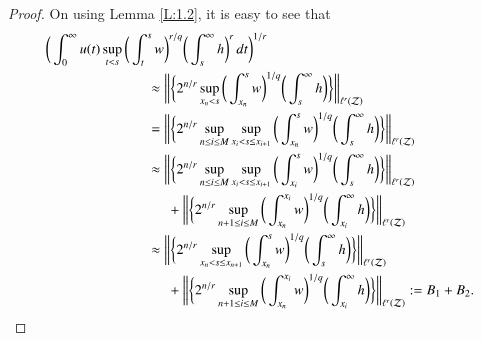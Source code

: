 \documentclass[12pt]{amsart}
\theoremstyle{plain}
\theoremstyle{definition}
\numberwithin{thm}{section}
\numberwithin{equation}{section}
\begin{document}
\begin{proof}
	On using Lemma \ref{L:1.2}, it is easy to see that
	\begin{align*}
    \bigg( \int_0^{\infty}  u(t) \sup_{t < s} \bigg(
	\int_t^s w \bigg)^{r / q} \bigg( \int_s^{\infty} h\bigg)^r \,dt\bigg)^{1/r} & \\
	& \hspace{-3cm}  \approx \bigg\| \bigg\{  2^{n / r} \sup_{x_n < s} \bigg(
	\int_{x_n}^s w \bigg)^{1 / q} \bigg( \int_s^{\infty} h\bigg) \bigg\} \bigg\|_{\ell^r({\mathcal Z})} \\
	& \hspace{-3cm}  =  \bigg\| \bigg\{  2^{n / r} \sup_{n \le i \le M} \sup_{x_i < s \le x_{i+1}} \bigg(
	\int_{x_n}^s w \bigg)^{1 / q} \bigg( \int_s^{\infty} h\bigg) \bigg\} \bigg\|_{\ell^r({\mathcal Z})} \\
	& \hspace{-3cm}  \approx  \bigg\| \bigg\{  2^{n / r} \sup_{n \le i \le M} \sup_{x_i < s \le x_{i+1}} \bigg(
	\int_{x_i}^s w \bigg)^{1 / q} \bigg( \int_s^{\infty} h\bigg) \bigg\} \bigg\|_{\ell^r({\mathcal Z})} \\
	& \hspace{-2.5cm}  +  \bigg\| \bigg\{  2^{n / r} \sup_{n + 1\le i \le M}  \bigg(
	\int_{x_n}^{x_i} w \bigg)^{1 / q} \bigg( \int_{x_i}^{\infty} h\bigg)\bigg\} \bigg\|_{\ell^r({\mathcal Z})} \\
	& \hspace{-3cm}  \approx  \bigg\| \bigg\{  2^{n / r} \sup_{x_n < s \le x_{n+1}} \bigg(
	\int_{x_n}^s w \bigg)^{1 / q} \bigg( \int_s^{\infty} h\bigg) \bigg\} \bigg\|_{\ell^r({\mathcal Z})} \\
	& \hspace{-2.5cm}  +  \bigg\| \bigg\{  2^{n / r} \sup_{n + 1 \le i \le M}  \bigg(
	\int_{x_n}^{x_i} w \bigg)^{1 / q} \bigg( \int_{x_i}^{\infty} h\bigg)\bigg\} \bigg\|_{\ell^r({\mathcal Z})} : = B_1 + B_2.
	\end{align*}


\end{proof}
\end{document}
